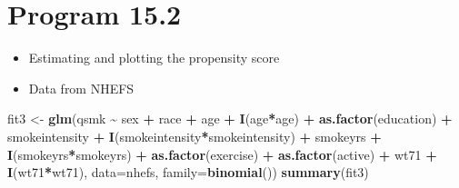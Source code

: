 \documentclass[
  10pt,
]{book}
\newenvironment{Shaded}{\begin{snugshade}}{\end{snugshade}}
\newcommand{\DataTypeTok}[1]{\textcolor[rgb]{0.13,0.29,0.53}{#1}}
\newcommand{\KeywordTok}[1]{\textcolor[rgb]{0.13,0.29,0.53}{\textbf{#1}}}
\newcommand{\NormalTok}[1]{#1}
\newcommand{\OperatorTok}[1]{\textcolor[rgb]{0.81,0.36,0.00}{\textbf{#1}}}
\newcommand{\StringTok}[1]{\textcolor[rgb]{0.31,0.60,0.02}{#1}}
\providecommand{\tightlist}{%
  \setlength{\itemsep}{0pt}\setlength{\parskip}{0pt}}
\begin{document}
\hypertarget{program-15.2}{%
\section{Program 15.2}\label{program-15.2}}

\begin{itemize}
\tightlist
\item
  Estimating and plotting the propensity score
\item
  Data from NHEFS
\end{itemize}

\begin{Shaded}
\begin{Highlighting}[]
\NormalTok{fit3 \textless{}{-}}\StringTok{ }\KeywordTok{glm}\NormalTok{(qsmk }\OperatorTok{\textasciitilde{}}\StringTok{ }\NormalTok{sex }\OperatorTok{+}\StringTok{ }\NormalTok{race }\OperatorTok{+}\StringTok{ }\NormalTok{age }\OperatorTok{+}\StringTok{ }\KeywordTok{I}\NormalTok{(age}\OperatorTok{*}\NormalTok{age) }\OperatorTok{+}\StringTok{ }\KeywordTok{as.factor}\NormalTok{(education)}
            \OperatorTok{+}\StringTok{ }\NormalTok{smokeintensity }\OperatorTok{+}\StringTok{ }\KeywordTok{I}\NormalTok{(smokeintensity}\OperatorTok{*}\NormalTok{smokeintensity) }\OperatorTok{+}\StringTok{ }\NormalTok{smokeyrs}
            \OperatorTok{+}\StringTok{ }\KeywordTok{I}\NormalTok{(smokeyrs}\OperatorTok{*}\NormalTok{smokeyrs) }\OperatorTok{+}\StringTok{ }\KeywordTok{as.factor}\NormalTok{(exercise) }\OperatorTok{+}\StringTok{ }\KeywordTok{as.factor}\NormalTok{(active)}
            \OperatorTok{+}\StringTok{ }\NormalTok{wt71 }\OperatorTok{+}\StringTok{ }\KeywordTok{I}\NormalTok{(wt71}\OperatorTok{*}\NormalTok{wt71), }\DataTypeTok{data=}\NormalTok{nhefs, }\DataTypeTok{family=}\KeywordTok{binomial}\NormalTok{())}
\KeywordTok{summary}\NormalTok{(fit3)}
\end{Highlighting}
\end{Shaded}
\end{document}
